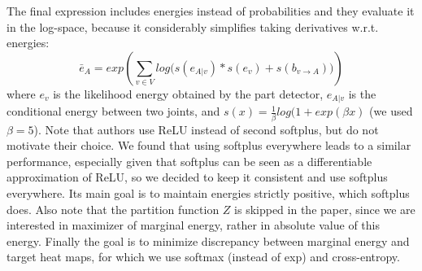 \documentclass[a4paper,10pt]{article}
\begin{document}
	The final expression includes energies instead of probabilities and they evaluate it in the log-space, because it considerably simplifies taking derivatives w.r.t. energies:	
	\begin{equation*}
		\bar{e}_A = exp \left(  \sum_{v \in V}  log \Big( s(e_{A|v}) * s(e_v) + s(b_{v \rightarrow A})  \Big) \right)
	\end{equation*}
	where $e_v$ is the likelihood energy obtained by the part detector, $e_{A|v}$ is the conditional energy between two joints, and $s(x) = \frac{1}{\beta} log(1 + exp(\beta x)$ (we used $\beta = 5$). Note that authors use ReLU instead of second softplus, but do not motivate their choice. We found that using softplus everywhere leads to a similar performance, especially given that softplus can be seen as a differentiable approximation of ReLU, so we decided to keep it consistent and use softplus everywhere. Its main goal is to maintain energies strictly positive, which softplus does. Also note that the partition function $Z$ is skipped in the paper, since we are interested in maximizer of marginal energy, rather in absolute value of this energy. Finally the goal is to minimize discrepancy between marginal energy and target heat maps, for which we use softmax (instead of exp) and cross-entropy.
	
\end{document}
